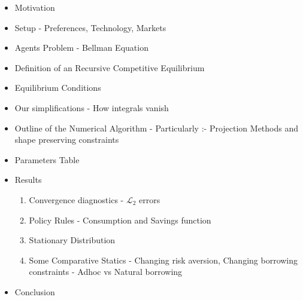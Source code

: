 \documentclass[a4paper,12pt]{article}
\begin{document}
\begin{itemize}
\item Motivation
\item Setup - Preferences, Technology, Markets
\item Agents Problem  - Bellman Equation
\item Definition of an Recursive Competitive Equilibrium
\item Equilibrium Conditions
\item Our simplifications - How integrals vanish
\item Outline of the Numerical Algorithm - Particularly :- Projection Methods and shape preserving constraints
\item Parameters Table
\item Results
\begin{enumerate}
\item Convergence diagnostics - $\mathcal{L}_2$ errors
\item Policy Rules - Consumption and Savings function
\item Stationary Distribution
\item Some Comparative Statics - Changing risk aversion, Changing borrowing constraints - Adhoc vs Natural borrowing
\end{enumerate}
\item Conclusion
\end{itemize}
\end{document}
